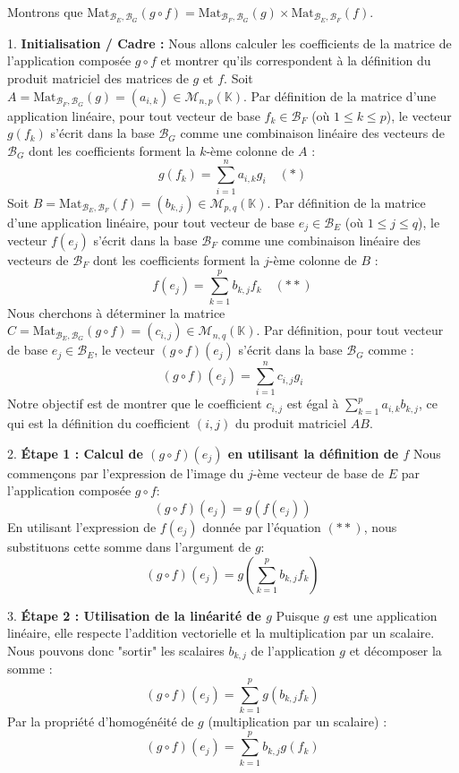 \documentclass[12pt,a4paper]{report}
\begin{document}
Montrons que $\text{Mat}_{\mathcal{B}_E, \mathcal{B}_G}(g \circ f) = \text{Mat}_{\mathcal{B}_F, \mathcal{B}_G}(g) \times \text{Mat}_{\mathcal{B}_E, \mathcal{B}_F}(f)$.

1.  \textbf{Initialisation / Cadre :}
    Nous allons calculer les coefficients de la matrice de l'application composée $g \circ f$ et montrer qu'ils correspondent à la définition du produit matriciel des matrices de $g$ et $f$.
    Soit $A = \text{Mat}_{\mathcal{B}_F, \mathcal{B}_G}(g) = (a_{i,k}) \in \mathcal{M}_{n,p}(\mathbb{K})$. Par définition de la matrice d'une application linéaire, pour tout vecteur de base $f_k \in \mathcal{B}_F$ (où $1 \le k \le p$), le vecteur $g(f_k)$ s'écrit dans la base $\mathcal{B}_G$ comme une combinaison linéaire des vecteurs de $\mathcal{B}_G$ dont les coefficients forment la $k$-ème colonne de $A$ :
    $$g(f_k) = \sum_{i=1}^n a_{i,k} g_i \quad (*)$$
    Soit $B = \text{Mat}_{\mathcal{B}_E, \mathcal{B}_F}(f) = (b_{k,j}) \in \mathcal{M}_{p,q}(\mathbb{K})$. Par définition de la matrice d'une application linéaire, pour tout vecteur de base $e_j \in \mathcal{B}_E$ (où $1 \le j \le q$), le vecteur $f(e_j)$ s'écrit dans la base $\mathcal{B}_F$ comme une combinaison linéaire des vecteurs de $\mathcal{B}_F$ dont les coefficients forment la $j$-ème colonne de $B$ :
    $$f(e_j) = \sum_{k=1}^p b_{k,j} f_k \quad (**)$$
    Nous cherchons à déterminer la matrice $C = \text{Mat}_{\mathcal{B}_E, \mathcal{B}_G}(g \circ f) = (c_{i,j}) \in \mathcal{M}_{n,q}(\mathbb{K})$. Par définition, pour tout vecteur de base $e_j \in \mathcal{B}_E$, le vecteur $(g \circ f)(e_j)$ s'écrit dans la base $\mathcal{B}_G$ comme :
    $$(g \circ f)(e_j) = \sum_{i=1}^n c_{i,j} g_i$$
    Notre objectif est de montrer que le coefficient $c_{i,j}$ est égal à $\sum_{k=1}^p a_{i,k} b_{k,j}$, ce qui est la définition du coefficient $(i,j)$ du produit matriciel $AB$.

2.  \textbf{Étape 1 : Calcul de $(g \circ f)(e_j)$ en utilisant la définition de $f$}
    Nous commençons par l'expression de l'image du $j$-ème vecteur de base de $E$ par l'application composée $g \circ f$:
    $$(g \circ f)(e_j) = g(f(e_j))$$
    En utilisant l'expression de $f(e_j)$ donnée par l'équation $(**)$, nous substituons cette somme dans l'argument de $g$:
    $$(g \circ f)(e_j) = g\left(\sum_{k=1}^p b_{k,j} f_k\right)$$

3.  \textbf{Étape 2 : Utilisation de la linéarité de $g$}
    Puisque $g$ est une application linéaire, elle respecte l'addition vectorielle et la multiplication par un scalaire. Nous pouvons donc "sortir" les scalaires $b_{k,j}$ de l'application $g$ et décomposer la somme :
    $$(g \circ f)(e_j) = \sum_{k=1}^p g(b_{k,j} f_k)$$
    Par la propriété d'homogénéité de $g$ (multiplication par un scalaire) :
    $$(g \circ f)(e_j) = \sum_{k=1}^p b_{k,j} g(f_k)$$
\end{document}

